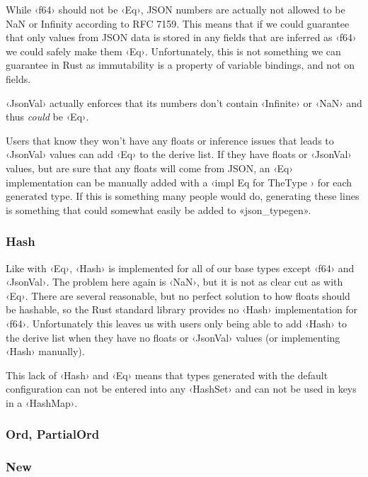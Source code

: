 While ‹f64› should not be ‹Eq›, JSON numbers are actually not allowed to be NaN or Infinity according to RFC 7159\cite[7]{RFC7159}. This means that if we could guarantee that only values from JSON data is stored in any fields that are inferred as ‹f64› we could safely make them ‹Eq›. Unfortunately, this is not something we can guarantee in Rust as immutability is a property of variable bindings, and not on fields.

‹JsonVal› actually enforces that its numbers don't contain ‹Infinite› or ‹NaN› and thus \emph{could} be ‹Eq›.

Users that know they won't have any floats or inference issues that leads to ‹JsonVal› values can add ‹Eq› to the derive list. If they have floats or ‹JsonVal› values, but are sure that any floats will come from JSON, an ‹Eq› implementation can be manually added with a ‹impl Eq for TheType {}› for each generated type. If this is something many people would do, generating these lines is something that could somewhat easily be added to «json_typegen».

\subsubsection{Hash}

Like with ‹Eq›, ‹Hash› is implemented for all of our base types except ‹f64› and ‹JsonVal›. The problem here again is ‹NaN›, but it is not as clear cut as with ‹Eq›. There are several reasonable, but no perfect solution to how floats should be hashable, so the Rust standard library provides no ‹Hash› implementation for ‹f64›. Unfortunately this leaves us with users only being able to add ‹Hash› to the derive list when they have no floats or ‹JsonVal› values (or implementing ‹Hash› manually).

This lack of ‹Hash› and ‹Eq› means that types generated with the default configuration can not be entered into any ‹HashSet› and can not be used in keys in a ‹HashMap›.

\subsubsection{Ord, PartialOrd}


\subsubsection{New}

